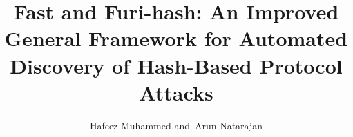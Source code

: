 \documentclass[journal]{IEEEtran}
\begin{document}
%
\title{Fast and Furi-hash: An Improved General Framework for Automated Discovery of Hash-Based Protocol Attacks}
%
%
%

\author{Hafeez Muhammed
        and~Arun Natarajan%
}

% 
%



%
{}
% 
\end{document}
